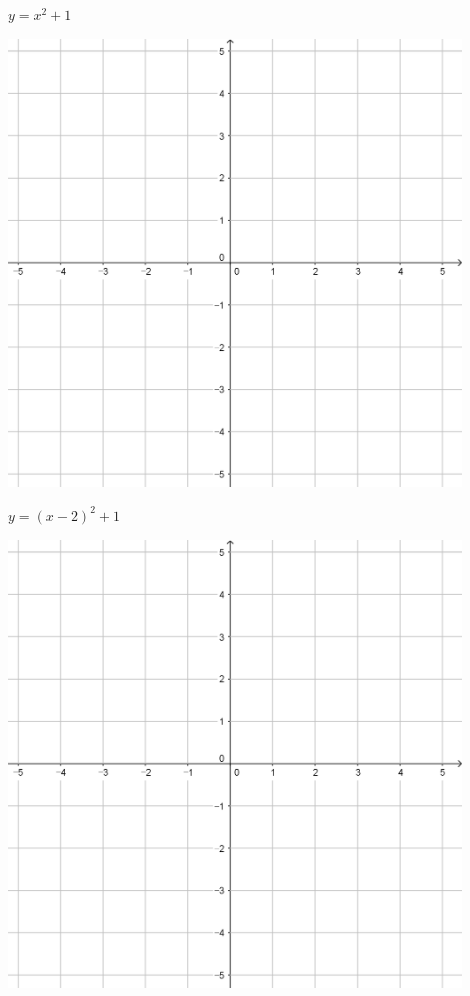 \documentclass[a4paper]{oblivoir}
\begin{document}
\begin{minipage}{0.45\textwidth}\centering
\(y=x^2+1\)
\par\bigskip\includegraphics[width=0.9\textwidth]{55}
\end{minipage}
\begin{minipage}{0.45\textwidth}\centering
\(y=(x-2)^2+1\)
\par\bigskip\includegraphics[width=0.9\textwidth]{55}
\end{minipage}\bigskip\bigskip\par
\end{document}

